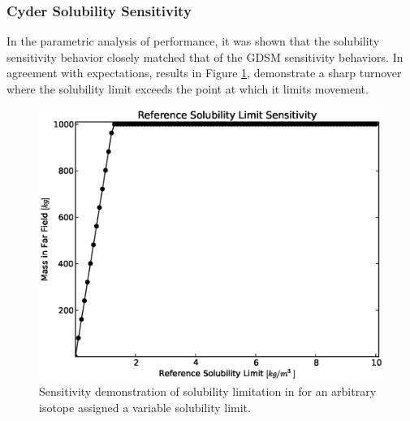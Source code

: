
\begin{frame}[ctb!]
\frametitle{Cyder Solubility Sensitivity}
In the parametric analysis of \Cyder performance, it was shown that the 
solubility sensitivity behavior closely matched that of the GDSM 
sensitivity behaviors. In agreement with expectations, \Cyder results in Figure 
\ref{fig:sol_result}, demonstrate a sharp turnover 
where the solubility limit exceeds the point at which it limits movement. 

\begin{figure}[htbp!]
\begin{center}
\includegraphics[width=0.7\linewidth]{./nuclide_demonstration/sol.eps}
\end{center}
\caption{Sensitivity demonstration of solubility limitation in \Cyder for an 
arbitrary isotope assigned a variable solubility limit. }
\label{fig:sol_result}
\end{figure}

\end{frame}
